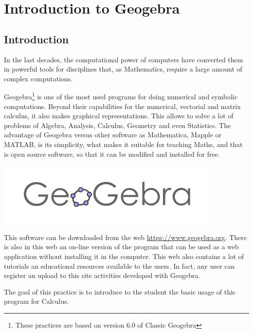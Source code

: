 \chapter{Introduction to Geogebra}

\section{Introduction}
In the last decades, the computational power of computers have converted them in powerful tools for disciplines that, as Mathematics, require a large amount of complex computations.

Geogebra\footnote{These practices are based on version 6.0 of Classic Geogebra} is one of the most used programs for doing numerical and symbolic computations.
Beyond their capabilities for the numerical, vectorial and matrix calculus, it also makes graphical representations.
This allows to solve a lot of problems of Algebra, Analysis, Calculus, Geometry and even Statistics.
The advantage of Geogebra versus other software as Mathematica, Mapple or MATLAB, is its simplicity, what makes it suitable for teaching Maths, and that is open source software, so that it can be modified and installed for free.

\begin{center}
\includegraphics[scale=0.8]{img/introduction/geogebra-logo}
\end{center}

This software can be downloaded from the web \url{https://www.geogebra.org}.
There is also in this web an on-line version of the program that can be used as a web application without installing it in the computer.
This web also contains a lot of tutorials an educational resources available to the users.
In fact, any user can register an upload to this site activities developed with Geogebra.

The goal of this practice is to introduce to the student the basic usage of this program for Calculus.


